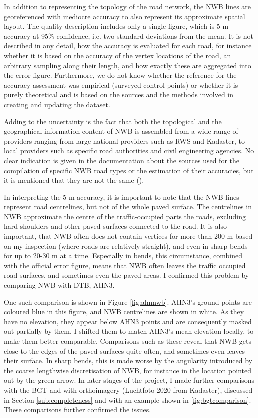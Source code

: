 In addition to representing the topology of the road network, the NWB lines are georeferenced with mediocre accuracy to also represent its approximate spatial layout. The quality description includes only a single figure, which is 5 m accuracy at 95\% confidence, i.e. two standard deviations from the mean. It is not described in any detail, how the accuracy is evaluated for each road, for instance whether it is based on the accuracy of the vertex locations of the road, an arbitrary sampling along their length, and how exactly these are aggregated into the error figure. Furthermore, we do not know whether the reference for the accuracy assessment was empirical (surveyed control points) or whether it is purely theoretical and is based on the sources and the methods involved in creating and updating the dataset.

Adding to the uncertainty is the fact that both the topological and the geographical information content of NWB is assembled from a wide range of providers ranging from large national providers such as RWS and Kadaster, to local providers such as specific road authorities and civil engineering agencies. No clear indication is given in the documentation about the sources used for the compilation of specific NWB road types or the estimation of their accuracies, but it is mentioned that they are not the same (\cite{nwb_docs}).

In interpreting the 5 m accuracy, it is important to note that the NWB lines represent road centrelines, but not of the whole paved surface. The centrelines in NWB approximate the centre of the traffic-occupied parts the roads, excluding hard shoulders and other paved surfaces connected to the road. It is also important, that NWB often does not contain vertices for more than 200 m based on my inspection (where roads are relatively straight), and even in sharp bends for up to 20-30 m at a time. Especially in bends, this circumstance, combined with the official error figure, means that NWB often leaves the traffic occupied road surfaces, and sometimes even the paved areas. I confirmed this problem by comparing NWB with DTB, AHN3.

One such comparison is shown in Figure \ref{fig:ahnnwb}. AHN3's ground points are coloured blue in this figure, and NWB centrelines are shown in white. As they have no elevation, they appear below AHN3 points and are consequently masked out partially by them. I shifted them to match AHN3's mean elevation locally, to make them better comparable. Comparisons such as these reveal that NWB gets close to the edges of the paved surfaces quite often, and sometimes even leaves their surface. In sharp bends, this is made worse by the angularity introduced by the coarse lengthwise discretisation of NWB, for instance in the location pointed out by the green arrow. In later stages of the project, I made further comparisons with the BGT and with orthoimagery (Luchtfoto 2020 from Kadaster), discussed in Section \ref{sub:completeness} and with an example shown in \ref{fig:bgtcomparison}. These comparisons further confirmed the issues.

